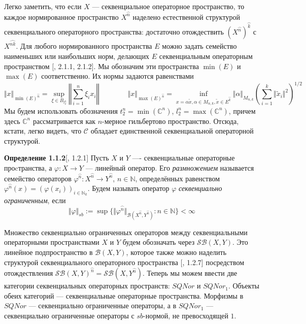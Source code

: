 \documentclass[12pt]{article}
\begin{document}
Легко заметить, что если $X$ --- секвенциальное операторное пространство, то каждое 
нормированное пространство $X^{\wideparen{n}}$ наделено естественной структурой секвенциального операторного пространства: достаточно отождествить $(X^{\wideparen{n}})^{\wideparen{k}}$ с $X^{\wideparen{nk}}$. Для любого нормированного пространства $E$ можно задать семейство наименьших или наибольших норм, делающих $E$ секвенциальным операторным пространством [\cite{LamOpFolgen}, 2.1.1, 2.1.2]. Мы обозначим эти пространства $\min(E)$ и $\max(E)$ соответственно. Их нормы задаются равенствами
$$
\Vert x\Vert_{\min(E)^{\wideparen{n}}}=\sup_{\xi\in B_{l_2^n}}\left\Vert\sum\limits_{i=1}^n \xi_i x_i\right\Vert
\qquad\qquad
\Vert x\Vert_{\max(E)^{\wideparen{n}}}=\inf_{x=\alpha\tilde x, \alpha\in M_{n,k}, \tilde{x}\in E^{\wideparen{k}}}\Vert\alpha\Vert_{M_{n,k}}\left(\sum\limits_{i=1}^k\Vert\tilde  x_i\Vert^2\right)^{1/2}
$$
Мы будем использовать обозначения $t_2^n=\min(\mathbb{C}^n)$, $l_2^n=\max(\mathbb{C}^n)$, причем здесь $\mathbb{C}^n$ рассматривается как $n$-мерное гильбертово пространство. Отсюда, кстати, легко видеть, что $\mathcal{C}$ обладает единственной секвенциальной операторной структурой.

\medskip

{\bf Определение 1.1.2}[\cite{LamOpFolgen}, 1.2.1]\label{DefSBOp}
Пусть $X$ и $Y$ ---- секвенциальные операторные проcтранства, а $\varphi : X \to Y$ --- линейный оператор. Его \textit{размножением} называется семейство операторов $\varphi^{\wideparen{n}} : X^{\wideparen{n}} \to Y^{\wideparen{n}}$, 
 $n\in\mathbb{N}$, определённых равенством $\varphi^{\wideparen{n}}(x)=(\varphi(x_i))_{i\in\mathbb{N}_k}$. Будем называть оператор $\varphi$ \textit{секвенциально ограниченным}, если 
$$
\Vert \varphi \Vert_{sb} := \sup\{\Vert \varphi^{\wideparen{n}}\Vert_{\mathcal{B}(X^{\wideparen{n}},Y^{\wideparen{n}})}:n\in\mathbb{N}\}  < \infty
$$

\medskip

Множество секвенциально ограниченных операторов между секвенциальными операторными пространствами $X$ и $Y$ будем обозначать через $\mathcal{SB}(X,Y)$. Это линейное подпространство в $\mathcal{B}(X,Y)$, которое также можно наделить структурой секвенциального операторного пространства [\cite{LamOpFolgen}, 1.2.7] посредством отождествления $\mathcal{SB}(X,Y)^{\wideparen{n}}=\mathcal{SB}(X, Y^{\wideparen{n}})$. Теперь мы можем ввести две категории секвенциальных операторных пространств: $SQNor$ и $SQNor_1$. Объекты обеих категорий --- секвенциальные операторные пространства. Морфизмы в $SQNor$ --- секвенциально ограниченные операторы, а в $SQNor_1$ --- секвенциально ограниченные операторы с $sb$-нормой, не превосходящей $1$. 
\end{document}

